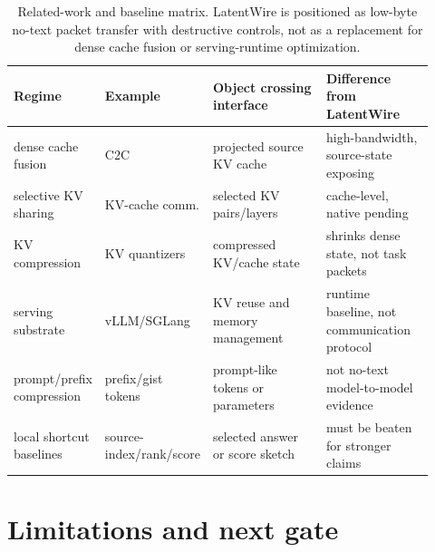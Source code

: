\documentclass{article}
\newcommand{\method}{LatentWire}
\begin{document}
\begin{table}[t]
  \centering
  \scriptsize
  \setlength{\tabcolsep}{3pt}
  \begin{tabular}{p{0.17\linewidth}p{0.17\linewidth}p{0.31\linewidth}p{0.27\linewidth}}
    \toprule
    Regime & Example & Object crossing interface & Difference from \method{} \\
    \midrule
    dense cache fusion & C2C & projected source KV cache & high-bandwidth, source-state exposing \\
    selective KV sharing & KV-cache comm. & selected KV pairs/layers & cache-level, native pending \\
    KV compression & KV quantizers & compressed KV/cache state & shrinks dense state, not task packets \\
    serving substrate & vLLM/SGLang & KV reuse and memory management & runtime baseline, not communication protocol \\
    prompt/prefix compression & prefix/gist tokens & prompt-like tokens or parameters & not no-text model-to-model evidence \\
    local shortcut baselines & source-index/rank/score & selected answer or score sketch & must be beaten for stronger claims \\
    \bottomrule
  \end{tabular}
  \caption{Related-work and baseline matrix. \method{} is positioned as low-byte no-text packet transfer with destructive controls, not as a replacement for dense cache fusion or serving-runtime optimization.}
  \label{tab:baseline-matrix}
\end{table}

\section{Limitations and next gate}
\end{document}
